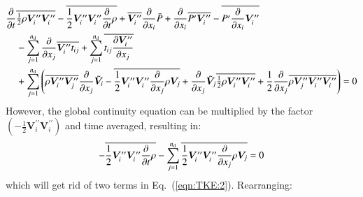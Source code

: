 \documentclass{warpdoc}
\newcommand{\alb}{\vspace{0.2cm}\\} %
\newcommand{\nd}{{{n}_{\rm d}}}
\newcommand{\mfc}{\textstyle}
\newcommand{\mfd}{\displaystyle}
\begin{document}
\begin{align}
  \frac{\partial }{\partial t} &\overline{{\mfc\frac{1}{2}}\rho \bm{V}_i^{\prime\prime} \bm{V}_i^{\prime\prime} }
     -\overline{\frac{1}{2}\bm{V}_i^{\prime\prime} \bm{V}_i^{\prime\prime}\frac{\partial }{\partial t} \rho }
   + \mfd\overline{\bm{V}_i^{\prime\prime}} \frac{\partial }{\partial x_i} \wbar{P}
       + \frac{\partial }{\partial x_i} \overline{ P^{\prime} \bm{V}_i^{\prime\prime}}
       - \overline{P^{\prime} \frac{\partial }{\partial x_i} \bm{V}_i^{\prime\prime} }\nonumber\alb
   &- \mfd\sum_{j=1}^{\nd} \frac{\partial }{\partial x_j} \overline{\bm{V}_i^{\prime\prime} t_{ij}}
     +\sum_{j=1}^{\nd} \overline{ t_{ij}\frac{\partial \bm{V}_i^{\prime\prime}}{\partial x_j}} \nonumber\alb
   &+ \mfd\sum_{j=1}^{\nd} \left(
                              \overline{\rho \bm{V}_i^{\prime\prime} \bm{V}_j^{\prime\prime}}
                                     \frac{\partial }{\partial x_j} {\wtilde{\bm{V}}_i}
                          -  \overline{{ \frac{1}{2}}\bm{V}_i^{\prime\prime} \bm{V}_i^{\prime\prime} \frac{\partial }{\partial x_j} \rho \bm{V}_j}
                          +  \frac{\partial }{\partial x_j} {\wtilde{\bm{V}}_j} \overline{{\mfc \frac{1}{2}} \rho \bm{V}_i^{\prime\prime} \bm{V}_i^{\prime\prime}}
                          +  {\frac{1}{2}}\frac{\partial }{\partial x_j} \overline{\rho {\bm{V}_j^{\prime\prime}} \bm{V}_i^{\prime\prime} \bm{V}_i^{\prime\prime}}
                     \right)  = 0
  \label{eqn:TKE:2}
\end{align}
%
However, the global continuity equation can be multiplied by
the factor $\left(-\frac{1}{2}\bm{V}_i^{\prime\prime} \bm{V}_i^{\prime\prime}\right)$ and time averaged, resulting in:
%
\begin{equation}
  -\overline{\frac{1}{2}\bm{V}_i^{\prime\prime} \bm{V}_i^{\prime\prime}\frac{\partial }{\partial t} \rho }
       -  \sum_{j=1}^\nd \overline{{ \frac{1}{2}}\bm{V}_i^{\prime\prime} \bm{V}_i^{\prime\prime} \frac{\partial }{\partial x_j} \rho \bm{V}_j} = 0
\end{equation}
%
which will get rid of two terms in Eq.\ (\ref{eqn:TKE:2}). Rearranging:
%
\end{document}
